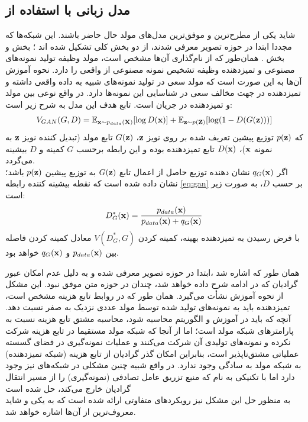 \subsection{مدل زبانی با استفاده از \gan{}}
شاید  یکی از مطرح‌ترین و موفق‌ترین مدل‌های مولد حال حاضر باشند. این شبکه‌ها که مجددا ابتدا در حوزه تصویر معرفی شدند، از دو بخش کلی تشکیل شده اند \cite{gan}؛ بخش  و بخش . همان‌طور که از نام‌گذاری آن‌ها مشخص است، مولد وظیفه تولید نمونه‌های مصنوعی و تمیزدهنده وظیفه تشخیص نمونه مصنوعی از واقعی را دارد. نحوه آموزش آن‌ها به این صورت است که مولد سعی در تولید نمونه‌های شبیه به داده واقعی داشته و تمیزدهنده در جهت مخالف سعی در شناسایی این نمونه‌ها دارد. در واقع نوعی  بین مولد و تمیزدهنده در جریان است. تابع هدف این مدل به شرح زیر است:
\begin{equation} \label{eq:gan}
	\begin{split}
		V_{GAN} (G, D) = \expected_{\bff{x} \sim p_{data}(\bff{X})} [\log D(\bff{x})] + \expected_{\bff{z} \sim p(\bff{Z})} [\log (1 - D(G(\bff{z})))]
	\end{split}
\end{equation}
که  $p({\bf z})$ توزیع پیشین تعریف شده بر روی نویز ${\bf z}$،
$G({\bf z})$
تابع مولد (تبدیل کننده نویز ${\bf z}$ به نمونه ${\bf x}$)، $D({\bf x})$ تابع تمیزدهنده بوده و این رابطه برحسب $G$ کمینه و $D$ بیشینه می‌گردد.\\
اگر $q_G({\bf x})$ نشان دهنده توزیع حاصل از اعمال تابع $G({\bf z})$ به توزیع پیشین $p({\bf z})$ باشد؛ نشان داده شده است که نقطه بیشینه کننده رابطه \ref{eq:gan} بر حسب $D$، به صورت زیر است:
\begin{gather}
	D_G^*({\bf x}) = \frac{p_{data}({\bf x})}{p_{data}({\bf x}) + q_G({\bf x})}
\end{gather}
با فرض رسیدن به تمیزدهنده بهینه، کمینه کردن $V(D^*_G,G)$ معادل کمینه کردن فاصله  بین $p_{data}({\bf x})$ و $q_G({\bf x})$ خواهد بود.

همان طور که اشاره شد \gan{}،ابتدا در حوزه تصویر معرفی شده و به دلیل عدم امکان عبور گرادیان که در ادامه شرح داده خواهد شد، چندان در حوزه متن موفق نبود. این مشکل از نحوه آموزش نشأت می‌گیرد. همان طور که در روابط تابع هزینه مشخص است، تمیزدهنده باید به نمونه‌های تولید شده توسط مولد عددی نزدیک به صفر نسبت دهد. آنچه که باید در آموزش و الگوریتم  محاسبه شود، محاسبه مشتق تابع هزینه نسبت به پارامتر‌های شبکه مولد است؛ اما از آنجا که شبکه مولد مستقیما در تابع هزینه شرکت نکرده و نمونه‌های تولیدی آن شرکت می‌کنند و عملیات نمونه‌گیری در فضای گسسته عملیاتی مشتق‌ناپذیر است، بنابراین امکان گذر گرادیان از تابع هزینه (شبکه تمیزدهنده) به شبکه مولد به سادگی وجود ندارد. در واقع شبیه چنین مشکلی در شبکه‌های \vae{} نیز وجود دارد اما با تکنیکی به نام  که منبع تزریق عامل تصادفی (نمونه‌گیری) را از مسیر انتقال گرادیان خارج می‌کند، حل شده است \cite{vae, gumbel}\\
به منظور حل این مشکل نیز رویکرد‌های متفاوتی ارائه شده است که به یکی و شاید معروف‌ترین از آن‌ها اشاره خواهد شد.\\
